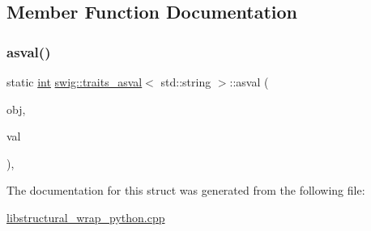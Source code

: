 \subsection{Member Function Documentation}
\mbox{\label{structswig_1_1traits__asval_3_01std_1_1string_01_4_a1b4d91079cc3870021fac8f5514404ff}} 
\subsubsection{\texorpdfstring{asval()}{asval()}}
{\footnotesize\ttfamily static \hyperlink{lp__lib_8h_adeb9ec6400320e4923ac9d836d509ddb}{int} \hyperlink{structswig_1_1traits__asval}{swig\+::traits\+\_\+asval}$<$ std\+::string $>$\+::asval (\begin{DoxyParamCaption}\item[{Py\+Object $\ast$}]{obj,  }\item[{\hyperlink{structswig_1_1traits__asval_3_01std_1_1string_01_4_a66eab9ad087e2527eb509f04e6e70d75}{value\+\_\+type} $\ast$}]{val }\end{DoxyParamCaption})\hspace{0.3cm}{\ttfamily [inline]}, {\ttfamily [static]}}



The documentation for this struct was generated from the following file\+:\begin{DoxyCompactItemize}
\item 
\hyperlink{libstructural__wrap__python_8cpp}{libstructural\+\_\+wrap\+\_\+python.\+cpp}\end{DoxyCompactItemize}
